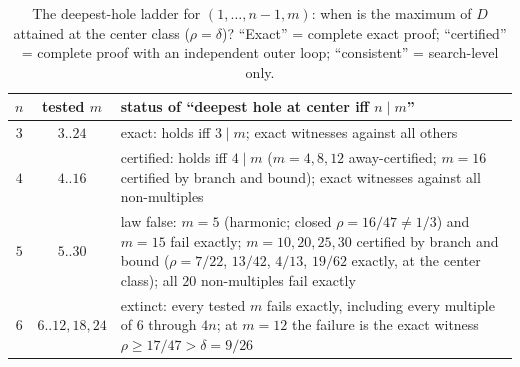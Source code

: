 \begin{table}[htbp]
\centering
\small
\caption{The deepest-hole ladder for $(1,\dots,n{-}1,m)$: when is the
maximum of $D$ attained at the center class ($\rho=\delta$)?
``Exact'' = complete exact proof; ``certified'' = complete proof with an
independent outer loop; ``consistent'' = search-level only.}
\label{tab:ladder}
\begin{tabularx}{\textwidth}{@{} c c >{\raggedright\arraybackslash}X @{}}
\toprule
$n$ & tested $m$ & status of ``deepest hole at center iff $n\mid m$''
\\
\midrule
$3$ & $3..24$ & exact: holds iff $3\mid m$; exact witnesses against all
others \\
$4$ & $4..16$ & certified: holds iff $4\mid m$ ($m=4,8,12$
away-certified; $m=16$ certified by branch and bound); exact witnesses
against all non-multiples \\
$5$ & $5..30$ & law false: $m=5$ (harmonic; closed
$\rho=16/47\ne1/3$) and $m=15$ fail exactly; $m=10,20,25,30$ certified
by branch and bound ($\rho=7/22$, $13/42$, $4/13$, $19/62$ exactly, at
the center class); all $20$ non-multiples fail exactly
\\
$6$ & $6..12,18,24$ & extinct: every tested $m$ fails exactly,
including every multiple of $6$ through $4n$; at $m=12$ the failure is
the exact witness $\rho\ge17/47>\delta=9/26$ \\
\bottomrule
\end{tabularx}
\end{table}

